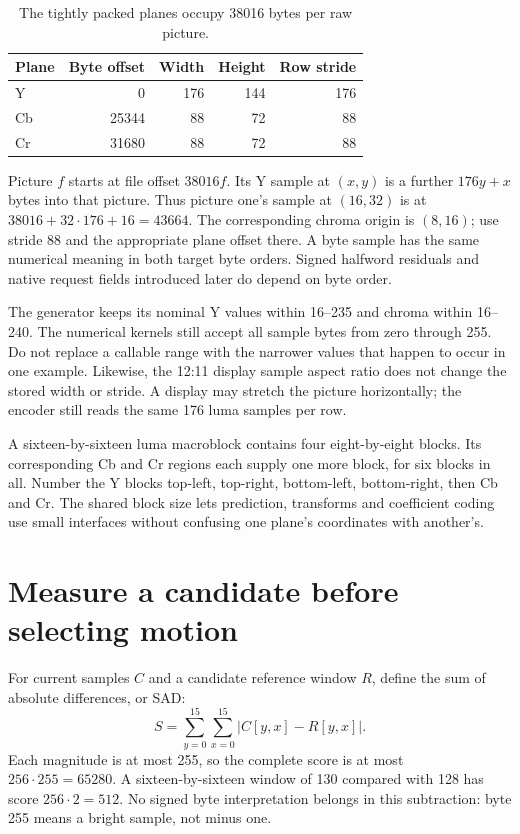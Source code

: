 \begin{table}[!ht]
  \centering
  \begin{tabular}{l r r r r}
    \toprule
    Plane & Byte offset & Width & Height & Row stride \\
    \midrule
    Y     & 0           & 176   & 144    & 176        \\
    Cb    & 25344       & 88    & 72     & 88         \\
    Cr    & 31680       & 88    & 72     & 88         \\
    \bottomrule
  \end{tabular}
  \caption{The tightly packed planes occupy 38016 bytes per raw picture.}
\end{table}

Picture $f$ starts at file offset $38016f$. Its Y sample at $(x,y)$ is a further
$176y+x$ bytes into that picture. Thus picture one's sample at $(16,32)$ is at
$38016+32\cdot176+16=43664$. The corresponding chroma origin is $(8,16)$;
use stride 88 and the appropriate plane offset there. A byte sample has the same
numerical meaning in both target byte orders. Signed halfword residuals and
native request fields introduced later do depend on byte order.

The generator keeps its nominal Y values within 16--235 and chroma within
16--240. The numerical kernels still accept all sample bytes from zero through
255. Do not replace a callable range with the narrower values that happen to
occur in one example. Likewise, the 12:11 display sample aspect ratio does not
change the stored width or stride. A display may stretch the picture horizontally;
the encoder still reads the same 176 luma samples per row.

A sixteen-by-sixteen luma macroblock contains four eight-by-eight blocks. Its
corresponding Cb and Cr regions each supply one more block, for six blocks in
all. Number the Y blocks top-left, top-right, bottom-left, bottom-right, then
Cb and Cr. The shared block size lets prediction, transforms and coefficient
coding use small interfaces without confusing one plane's coordinates with
another's.

\section{Measure a candidate before selecting motion}

For current samples $C$ and a candidate reference window $R$, define the sum of
absolute differences, or SAD:
\[
  S=\sum_{y=0}^{15}\sum_{x=0}^{15}|C[y,x]-R[y,x]|.
\]
Each magnitude is at most 255, so the complete score is at most
$256\cdot255=65280$. A sixteen-by-sixteen window of 130 compared with 128 has
score $256\cdot2=512$. No signed byte interpretation belongs in this subtraction:
byte 255 means a bright sample, not minus one.

